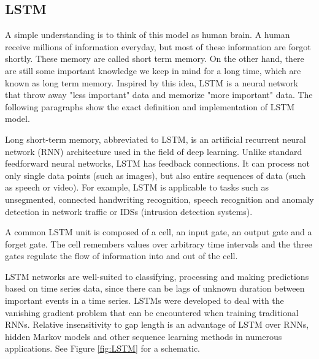 \documentclass[twoside]{report}
\begin{document}
\begin{spacing}{1}
\subsection{LSTM}

A simple understanding is to think of this model as human brain. A human receive millions of information everyday, but most of these information are forgot shortly. These memory are called short term memory. On the other hand, there are still some important knowledge we keep in mind for a long time, which are known as long term memory. Inspired by this idea, LSTM is a neural network that throw away "less important" data and memorize "more important" data. The following paragraphs show the exact definition and implementation of LSTM model.

Long short-term memory, abbreviated to LSTM, is an artificial recurrent neural network (RNN) architecture used in the field of deep learning. Unlike standard feedforward neural networks, LSTM has feedback connections. It can process not only single data points (such as images), but also entire sequences of data (such as speech or video). For example, LSTM is applicable to tasks such as unsegmented, connected handwriting recognition, speech recognition and anomaly detection in network traffic or IDSs (intrusion detection systems).\cite{greff2016lstm}


A common LSTM unit is composed of a cell, an input gate, an output gate and a forget gate. The cell remembers values over arbitrary time intervals and the three gates regulate the flow of information into and out of the cell.

LSTM networks are well-suited to classifying, processing and making predictions based on time series data, since there can be lags of unknown duration between important events in a time series. LSTMs were developed to deal with the vanishing gradient problem that can be encountered when training traditional RNNs. Relative insensitivity to gap length is an advantage of LSTM over RNNs, hidden Markov models and other sequence learning methods in numerous applications. See Figure \ref{fig:LSTM} for a schematic.


\end{spacing}
\end{document}
